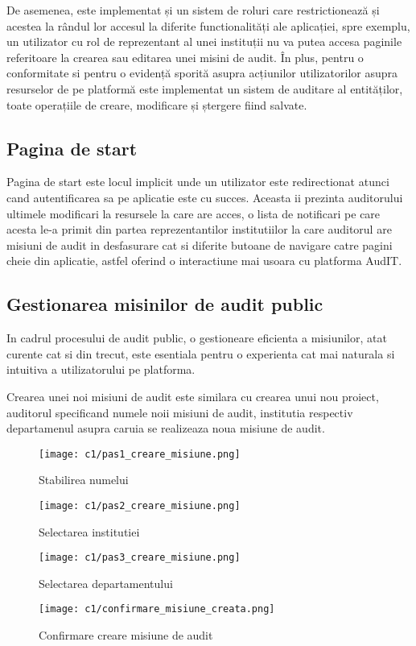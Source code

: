 De asemenea, este implementat și un sistem de roluri care restrictionează și acestea la rândul lor accesul la diferite functionalități ale aplicației, spre exemplu, un utilizator cu rol de reprezentant al unei instituții nu va putea accesa paginile referitoare la crearea sau editarea unei misini de audit.
În plus, pentru o conformitate si pentru o evidență sporită asupra acțiunilor utilizatorilor asupra resurselor de pe platformă este implementat un sistem de auditare al entităților, toate operațiile de creare, modificare și ștergere fiind salvate.

\subsection{Pagina de start}
Pagina de start este locul implicit unde un utilizator este redirectionat atunci cand autentificarea sa pe aplicatie este cu succes. Aceasta ii prezinta auditorului ultimele modificari la resursele la care are acces, o lista de notificari pe care acesta le-a primit din partea reprezentantilor institutiilor la care auditorul are misiuni de audit in desfasurare cat si diferite butoane de navigare catre pagini cheie din aplicatie, astfel oferind o interactiune mai usoara cu platforma AudIT.

\subsection{Gestionarea misinilor de audit public}
In cadrul procesului de audit public, o gestioneare eficienta a misiunilor, atat curente cat si din trecut, este esentiala pentru o experienta cat mai naturala si intuitiva a utilizatorului pe platforma.

Crearea unei noi misiuni de audit este similara cu crearea unui nou proiect, auditorul specificand numele noii misiuni de audit, institutia respectiv departamenul asupra caruia se realizeaza noua misiune de audit.

	\vspace{0.5 cm}
\begin{figure}[h]
	\centering
	\begin{minipage}{.5\textwidth}
		\centering
		\texttt{[image: c1/pas1\_creare\_misiune.png]}
		\caption{Stabilirea numelui}
		
	\end{minipage}%
	\begin{minipage}{.5\textwidth}
		\centering
		\texttt{[image: c1/pas2\_creare\_misiune.png]}
		\caption{Selectarea institutiei}
	
	\end{minipage}
	\vspace{0.5 cm}

	\centering
	
	\texttt{[image: c1/pas3\_creare\_misiune.png]}
		\vspace{0.5 cm}
	\caption{Selectarea departamentului}
	
	\texttt{[image: c1/confirmare\_misiune\_creata.png]}
	\caption{Confirmare creare misiune de audit}
	
\end{figure}


